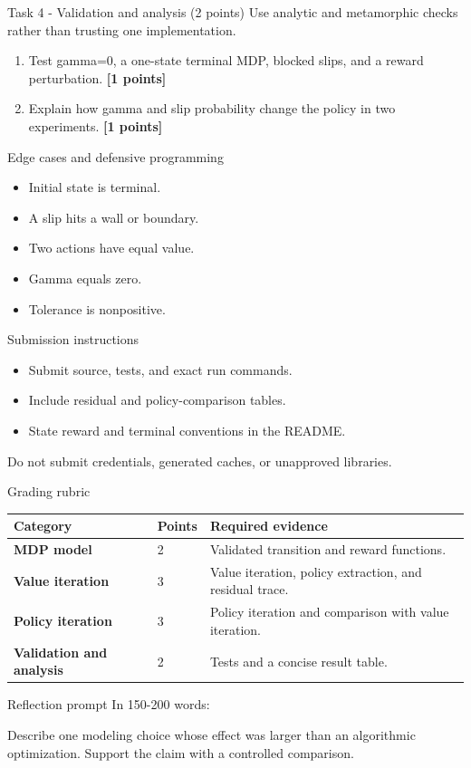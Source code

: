 \documentclass[aspectratio=169,11pt]{beamer}
\begin{document}
\begin{frame}{Task 4 - Validation and analysis (2 points)}
\small
Use analytic and metamorphic checks rather than trusting one implementation.

\vspace{0.2cm}
\begin{enumerate}
\item[\textbf{a.}] Test gamma=0, a one-state terminal MDP, blocked slips, and a reward perturbation. \hfill{\color{courseblue}\textbf{[1 points]}}
\item[\textbf{b.}] Explain how gamma and slip probability change the policy in two experiments. \hfill{\color{courseblue}\textbf{[1 points]}}
\end{enumerate}
\end{frame}

\begin{frame}{Edge cases and defensive programming}
\small
\begin{itemize}
  \item Initial state is terminal.
  \item A slip hits a wall or boundary.
  \item Two actions have equal value.
  \item Gamma equals zero.
  \item Tolerance is nonpositive.
\end{itemize}
\end{frame}

\begin{frame}{Submission instructions}
\small
\begin{itemize}
  \item Submit source, tests, and exact run commands.
  \item Include residual and policy-comparison tables.
  \item State reward and terminal conventions in the README.
\end{itemize}
\vspace{0.2cm}
\alert{Do not submit credentials, generated caches, or unapproved libraries.}
\end{frame}

\begin{frame}{Grading rubric}
\scriptsize
\begin{tabularx}{\textwidth}{>{\bfseries}p{} p{} X}
\toprule
Category & Points & Required evidence \\
\midrule
MDP model & 2 & Validated transition and reward functions. \\
Value iteration & 3 & Value iteration, policy extraction, and residual trace. \\
Policy iteration & 3 & Policy iteration and comparison with value iteration. \\
Validation and analysis & 2 & Tests and a concise result table. \\
\bottomrule
\end{tabularx}
\end{frame}

\begin{frame}{Reflection prompt}
In 150-200 words:

Describe one modeling choice whose effect was larger than an algorithmic optimization. Support the claim with a controlled comparison.
\end{frame}
\end{document}

